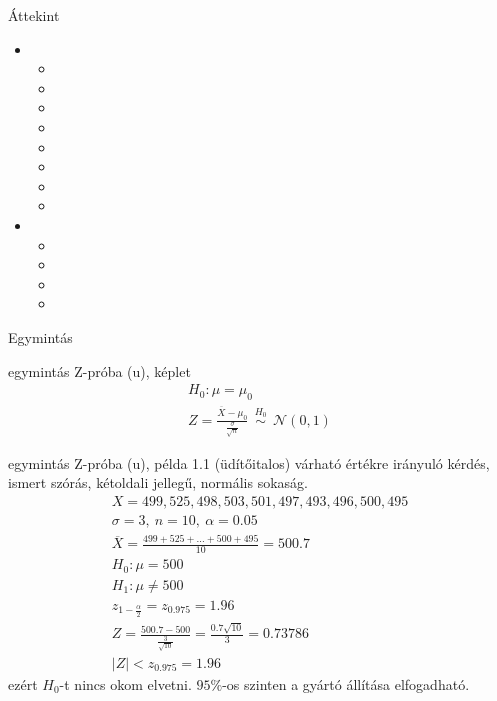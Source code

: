 \documentclass[12pt]{amsbook}
\begin{document}
\pagestyle{plain}
\begin{spacing}{1.5}


\begin{section}{Áttekint}
   \begin{itemize}
   \item {}
      \begin{itemize}
         \item {}
         \item {}
         \item {}
         \item {}
         \item {}
         \item {}
         \item {}
         \item {}
      \end{itemize}
   \item {}
      \begin{itemize}
         \item {}
         \item {}
         \item {}
         \item {}
      \end{itemize}
   \end{itemize}
\end{section}

\begin{section}{Egymintás}
\label{1m}
\begin{subsection}{egymintás Z-próba (u), képlet}
   \label{1mzk}
   \begin{gather*}
   H_0: \mu = \mu_0\\
   Z=\frac{\overline{X}-\mu_0}{\frac{\sigma}{\sqrt{n}}} \ \
   \overset{H_0}{\sim} \ \ {\mathcal N}(0,1)
   \end{gather*}
\end{subsection}

\begin{subsection}{egymintás Z-próba (u), példa}
   \label{1mzp}
   1.1 (üdítőitalos)
   várható értékre irányuló kérdés, ismert szórás, kétoldali jellegű, normális sokaság.
   \begin{gather*}
   X=499, 525, 498, 503, 501, 497, 493, 496, 500, 495\\
   \sigma=3, \ n=10, \ \alpha=0.05 \\
   \overline{X}=\frac{499+525+\ldots +500+495}{10}=500.7\\
   H_{0}: \mu = 500\\
   H_{1}: \mu \neq 500\\
   z_{1-\frac{\alpha}{2}}=z_{0.975}=1.96\\
   Z=\frac{500.7-500}{\frac{3}{\sqrt{10}}}=\frac{0.7\sqrt{10}}{3}=0.73786\\
   |Z|<z_{0.975}=1.96\ \ \
   \end{gather*}
   ezért $H_{0}$-t nincs okom elvetni. $95\%$-os szinten a gyártó állítása elfogadható.
\end{subsection}%



\end{section}
\end{spacing}
\end{document}
